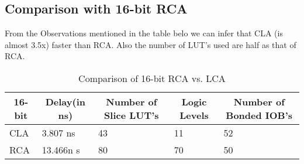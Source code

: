 \subsection{Comparison with 16-bit RCA}
From the Observations mentioned in the table belo we can infer that CLA (is almost 3.5x) faster than RCA. Also the number of LUT's used are half as that of RCA.
\begin{center}
\begin{longtable}{|l|l|l|l|l|}
\caption{Comparison of 16-bit RCA vs. LCA }\label{tab:long} \\
\hline \multicolumn{1}{|c|}{\textbf{16-bit}} & \multicolumn{1}{c|}{\textbf{Delay(in ns)}} & \multicolumn{1}{c|}{\textbf{Number of Slice LUT's}} & \multicolumn{1}{c|}{\textbf{Logic Levels}} &
\multicolumn{1}{c|}{\textbf{Number of Bonded IOB's}} \\ \hline 
\endfirsthead
CLA & 3.807 ns & 43 & 11 & 52 \\
RCA & 13.466n s & 80 & 70 & 50 \\
\hline
\end{longtable}
\end{center}